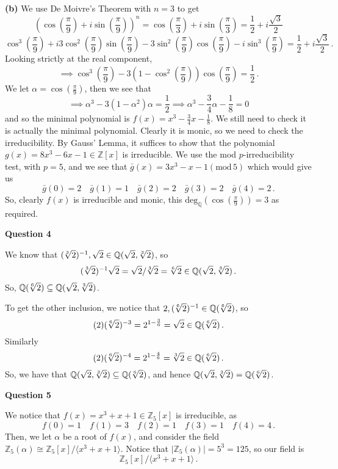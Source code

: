\documentclass[10pt]{article}
\newcommand{\Z}{\mathbb{Z}}
\newcommand{\Q}{\mathbb{Q}}
\begin{document}
\textbf{(b)} We use De Moivre's Theorem with $n=3$ to get
\[ \left(\cos\left(\frac{\pi}{9}\right) + i\sin\left(\frac{\pi}{9}\right)\right)^{n} = \cos\left(\frac{\pi}{3}\right) + i\sin\left(\frac{\pi}{3}\right) = \frac{1}{2} + i\frac{\sqrt{3}}{2}\]
\[ \cos^{3}\left(\frac{\pi}{9}\right) + i3\cos^{2}\left(\frac{\pi}{9}\right)\sin\left(\frac{\pi}{9}\right) - 3\sin^{2}\left(\frac{\pi}{9}\right)\cos\left(\frac{\pi}{9}\right) - i\sin^{3}\left(\frac{\pi}{9}\right) = \frac{1}{2} + i\frac{\sqrt{3}}{2} \,.\]
Looking strictly at the real component,
\[ \implies \cos^{3}\left(\frac{\pi}{9}\right) - 3\left(1- \cos^{2}\left(\frac{\pi}{9}\right)\right)\cos\left(\frac{\pi}{9}\right) = \frac{1}{2} \, .\]
We let $\alpha = \cos\left(\frac{\pi}{9}\right)$, then we see that
\[ \implies \alpha^{3} - 3(1-\alpha^{2})\alpha = \frac{1}{2} \implies \alpha^{3} -\frac{3}{4}\alpha - \frac{1}{8} = 0 \]
and so the minimal polynomial is $f(x) = x^{3} - \frac{3}{4}x - \frac{1}{8}$. We still need to check it is actually the minimal polynomial. Clearly it is monic, so we need to check the irreducibility. By Gauss' Lemma, it suffices to show that the polynomial $g(x) = 8x^{3} - 6x - 1 \in \Z[x]$ is irreducible. We use the mod $p$-irreducibility test, with $p=5$, and we see that $\bar{g}(x) = 3x^{3} - x - 1 (\text{mod} \, 5)$ which would give us
\[ \bar{g}(0) = 2 \quad \bar{g}(1) = 1 \quad \bar{g}(2) = 2 \quad \bar{g}(3) = 2 \quad \bar{g}(4) = 2 \, .\]
So, clearly $f(x)$ is irreducible and monic, this $\text{deg}_{\Q}\left(\cos\left(\frac{\pi}{9}\right)\right) = 3$ as required.


\newpage
\textbf{Question 4}

We know that $(\sqrt[\leftroot{1}\uproot{0}3]{2})^{-1}, \sqrt{2} \in \Q(\sqrt{2},\sqrt[\leftroot{1}\uproot{0}3]{2})$, so
\[(\sqrt[\leftroot{1}\uproot{0}3]{2})^{-1}\sqrt{2} = \sqrt{2}/\sqrt[\leftroot{1}\uproot{0}3]{2} = \sqrt[\leftroot{1}\uproot{0}6]{2} \in \Q(\sqrt{2},\sqrt[\leftroot{1}\uproot{0}3]{2})\, .\]
So, $\Q(\sqrt[\leftroot{1}\uproot{0}6]{2})\subseteq \Q(\sqrt{2},\sqrt[\leftroot{1}\uproot{0}3]{2})$.

To get the other inclusion, we notice that $2,(\sqrt[\leftroot{1}\uproot{0}6]{2})^{-1} \in \Q(\sqrt[\leftroot{1}\uproot{0}6]{2})$, so
\[ (2)(\sqrt[\leftroot{1}\uproot{0}6]{2})^{-3} = 2^{1 - \frac{3}{6}} = \sqrt{2} \in \Q(\sqrt[\leftroot{1}\uproot{0}6]{2}) \, .\]
Similarly
\[ (2)(\sqrt[\leftroot{1}\uproot{0}6]{2})^{-4} = 2^{1 - \frac{4}{6}} = \sqrt[\leftroot{1}\uproot{0}3]{2} \in \Q(\sqrt[\leftroot{1}\uproot{0}6]{2}) \, .\]
So, we have that $\Q(\sqrt{2},\sqrt[\leftroot{1}\uproot{0}3]{2}) \subseteq \Q(\sqrt[\leftroot{1}\uproot{0}6]{2})$, and hence $\Q(\sqrt{2},\sqrt[\leftroot{1}\uproot{0}3]{2}) = \Q(\sqrt[\leftroot{1}\uproot{0}6]{2})$.

\newpage
\textbf{Question 5}

We notice that $f(x) = x^{3} + x + 1 \in \Z_{5}[x]$ is irreducible, as
\[ f(0) = 1 \quad f(1) = 3 \quad f(2) = 1 \quad f(3) = 1 \quad f(4) = 4 \, .\]
Then, we let $\alpha$ be a root of $f(x)$, and consider the field $\Z_{5}(\alpha) \cong \Z_{5}[x]/\langle x^{3} + x + 1\rangle$. Notice that $|\Z_{5}(\alpha)| = 5^{3} = 125$, so our field is
\[ \Z_{5}[x]/\langle x^{3} + x + 1\rangle \, .\]
\end{document}
